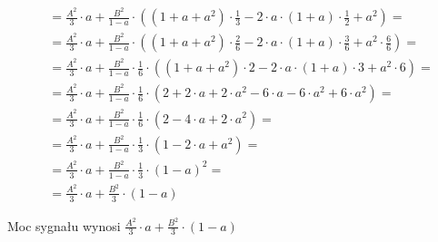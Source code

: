 \begin{task}
\begin{align*}
 &=\frac{A^2}{3}\cdot a
 +\frac{B^2}{1 - a} \cdot \left( \left(1 +a + a^2 \right)\cdot \frac{1}{3}
 - 2 \cdot a \cdot \left( 1 + a \right) \cdot \frac{1}{2}
 + a^2 \right)=\\
 &=\frac{A^2}{3}\cdot a
 +\frac{B^2}{1 - a} \cdot \left( \left(1 +a + a^2 \right)\cdot \frac{2}{6} - 2 \cdot a \cdot \left( 1 + a \right) \cdot \frac{3}{6}
 + a^2 \cdot \frac{6}{6} \right)=\\ 
 &=\frac{A^2}{3}\cdot a +\frac{B^2}{1 - a} \cdot \frac{1}{6} \cdot \left( \left(1 +a + a^2 \right)\cdot 2
 - 2\cdot a \cdot \left( 1 + a \right) \cdot 3
 + a^2 \cdot 6 \right)=\\  
 &=\frac{A^2}{3}\cdot a
 +\frac{B^2}{1 - a} \cdot \frac{1}{6} \cdot \left( 2 +2\cdot a + 2\cdot a^2 - 6\cdot a - 6\cdot a^2 + 6 \cdot a^2 \right)=\\
 &=\frac{A^2}{3}\cdot a
 +\frac{B^2}{1 - a} \cdot \frac{1}{6} \cdot \left( 2 - 4 \cdot a + 2\cdot a^2 \right)=\\
 &=\frac{A^2}{3}\cdot a +\frac{B^2}{1 - a} \cdot \frac{1}{3} \cdot \left( 1 - 2 \cdot a + a^2 \right)=\\
 &=\frac{A^2}{3}\cdot a +\frac{B^2}{1 - a} \cdot \frac{1}{3} \cdot \left( 1 - a \right)^2=\\
 &=\frac{A^2}{3}\cdot a + \frac{B^2}{3} \cdot \left( 1 - a \right)
\end{align*}

Moc sygnału wynosi $\frac{A^2}{3}\cdot a + \frac{B^2}{3} \cdot \left( 1 - a \right)$
\end{task}